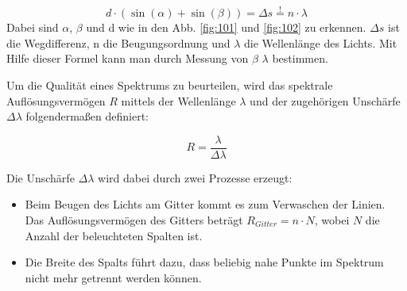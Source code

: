 \begin{equation}
d \cdot ( \sin(\alpha) + \sin(\beta) ) = \Delta s \overset{!}{=} n \cdot \lambda
\label{form:Interferenz}
\end{equation}
Dabei sind $\alpha$, $\beta$ und d wie in den Abb. \ref{fig:101} und \ref{fig:102} zu erkennen. $\Delta s$ ist  die Wegdifferenz, n die Beugungsordnung und $\lambda$ die Wellenlänge des Lichts. Mit Hilfe dieser Formel kann man durch Messung von $\beta$ $\lambda$ bestimmen.

Um die Qualität  eines Spektrums zu beurteilen, wird das spektrale Auflösungsvermögen $R$ mittels der Wellenlänge $\lambda$ und der zugehörigen Unschärfe $\Delta \lambda$ folgendermaßen definiert:

\begin{equation}
R = \frac{\lambda}{\Delta \lambda}
\end{equation}

Die Unschärfe $\Delta \lambda$  wird  dabei durch zwei Prozesse erzeugt:

\begin{itemize}

\item Beim Beugen des Lichts am Gitter kommt es zum Verwaschen der Linien. Das Auflösungsvermögen des Gitters beträgt $ R_{Gitter} = n \cdot N $, wobei $ N $ die Anzahl der beleuchteten Spalten ist.

\item Die Breite des Spalts führt dazu, dass beliebig nahe Punkte im Spektrum nicht mehr getrennt werden können. 

\end{itemize}

